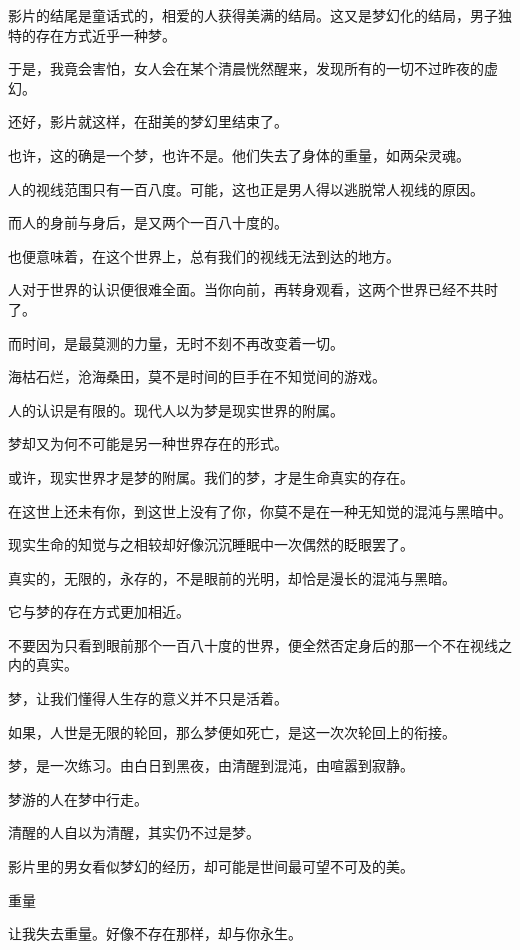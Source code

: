 \documentclass[12pt,a4paper]{article}
\newcommand{\subpart}[1]{
	\begingroup \par
	\vspace{1ex} \centering #1
	\par \endgroup \nopagebreak[4]
}
\begin{document}
		影片的结尾是童话式的，相爱的人获得美满的结局。这又是梦幻化的结局，男子独特的存在方式近乎一种梦。\par
		于是，我竟会害怕，女人会在某个清晨恍然醒来，发现所有的一切不过昨夜的虚幻。\par
		还好，影片就这样，在甜美的梦幻里结束了。\par
		也许，这的确是一个梦，也许不是。他们失去了身体的重量，如两朵灵魂。\par
		人的视线范围只有一百八度。可能，这也正是男人得以逃脱常人视线的原因。\par
		而人的身前与身后，是又两个一百八十度的。\par
		也便意味着，在这个世界上，总有我们的视线无法到达的地方。\par
		人对于世界的认识便很难全面。当你向前，再转身观看，这两个世界已经不共时了。\par
		而时间，是最莫测的力量，无时不刻不再改变着一切。\par
		海枯石烂，沧海桑田，莫不是时间的巨手在不知觉间的游戏。\par
		人的认识是有限的。现代人以为梦是现实世界的附属。\par
		梦却又为何不可能是另一种世界存在的形式。\par
		或许，现实世界才是梦的附属。我们的梦，才是生命真实的存在。\par
		在这世上还未有你，到这世上没有了你，你莫不是在一种无知觉的混沌与黑暗中。\par
		现实生命的知觉与之相较却好像沉沉睡眠中一次偶然的眨眼罢了。\par
		真实的，无限的，永存的，不是眼前的光明，却恰是漫长的混沌与黑暗。\par
		它与梦的存在方式更加相近。\par
		不要因为只看到眼前那个一百八十度的世界，便全然否定身后的那一个不在视线之内的真实。\par
		梦，让我们懂得人生存的意义并不只是活着。\par
		如果，人世是无限的轮回，那么梦便如死亡，是这一次次轮回上的衔接。\par
		梦，是一次练习。由白日到黑夜，由清醒到混沌，由喧嚣到寂静。\par
		梦游的人在梦中行走。\par
		清醒的人自以为清醒，其实仍不过是梦。\par
		影片里的男女看似梦幻的经历，却可能是世间最可望不可及的美。


		\subpart{重量}

		让我失去重量。好像不存在那样，却与你永生。
\end{document}

